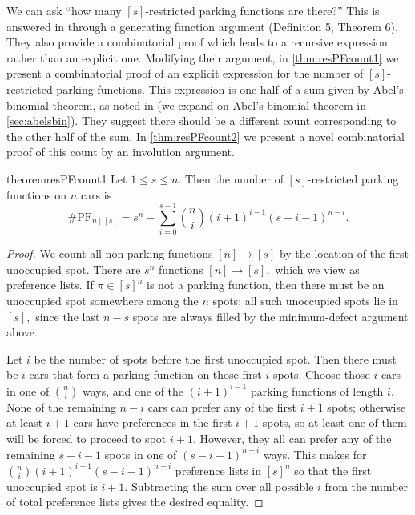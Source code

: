 \documentclass[12pt]{article}
\begin{document}
We can ask ``how many $[s]$-restricted parking functions are there?'' This is answered in \cite{cameron-johannsen-prellberg-schweitzer-2008} through a generating function argument (Definition 5, Theorem 6). They also provide a combinatorial proof which leads to a recursive expression rather than an explicit one. Modifying their argument, in \cref{thm:resPFcount1} we present a combinatorial proof of an explicit expression for the number of $[s]$-restricted parking functions. This expression is one half of a sum given by Abel's binomial theorem, as noted in \cite{cameron-johannsen-prellberg-schweitzer-2008} (we expand on Abel's binomial theorem in \cref{sec:abelsbin}). They suggest there should be a different count corresponding to the other half of the sum. In \cref{thm:resPFcount2} we present a novel combinatorial proof of this count by an involution argument.

\begin{restatable}{theorem}{resPFcount1}
    \label{thm:resPFcount1}
    Let $1\le s\le n.$ Then the number of $[s]$-restricted parking functions on $n$ cars is
    \[\#\mathrm{PF}_{n\mid [s]}=s^{n} - \sum_{i = 0}^{s - 1} \binom{n}{i} (i + 1)^{i - 1} (s - i - 1)^{n - i}.\]
\end{restatable}

\begin{proof}
    We count all non-parking functions $[n]\to[s]$ by the location of the first unoccupied spot. There are $s^{n}$ functions $[n]\to[s],$ which we view as preference lists. If $\pi\in[s]^n$ is not a parking function, then there must be an unoccupied spot somewhere among the $n$ spots; all such unoccupied spots lie in $[s],$ since the last $n-s$ spots are always filled by the minimum-defect argument above.

	Let $i$ be the number of spots before the first unoccupied spot. Then there must be $i$ cars that form a parking function on those first $i$ spots. Choose those $i$ cars in one of $\binom{n}{i}$ ways, and one of the $(i + 1)^{i - 1}$ parking functions of length $i$. None of the remaining $n - i$ cars can prefer any of the first $i + 1$ spots; otherwise at least $i+1$ cars have preferences in the first $i+1$ spots, so at least one of them will be forced to proceed to spot $i+1$. However, they all can prefer any of the remaining $s - i - 1$ spots in one of $(s - i - 1)^{n - i}$ ways. This makes for $\binom{n}{i} (i + 1)^{i - 1}(s - i - 1)^{n - i}$ preference lists in $[s]^{n}$ so that the first unoccupied spot is $i + 1$. Subtracting the sum over all possible $i$ from the number of total preference lists gives the desired equality.
\end{proof}
\end{document}
